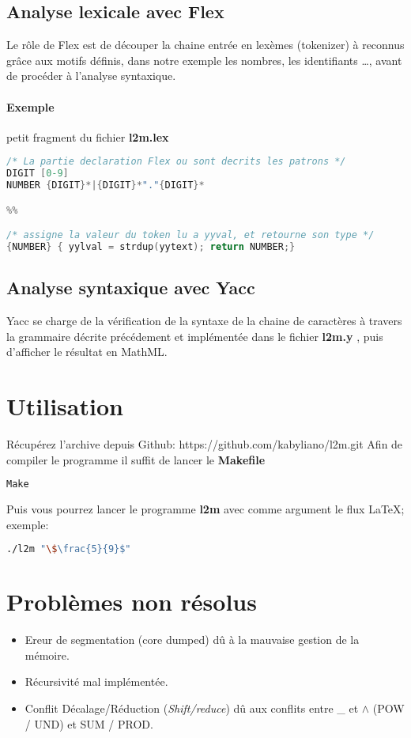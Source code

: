 \documentclass[12pt,a4paper]{article}
\begin{document}
\subsection{Analyse lexicale avec Flex}

Le rôle de Flex est de découper la chaine entrée en lexèmes (tokenizer) à reconnus grâce aux  motifs définis, dans notre exemple les nombres, les identifiants \ldots , avant de procéder à l'analyse syntaxique.

\paragraph{Exemple}
petit fragment du fichier \textbf{l2m.lex}

\begin{lstlisting}[language=C]
/* La partie declaration Flex ou sont decrits les patrons */
DIGIT [0-9]
NUMBER {DIGIT}*|{DIGIT}*"."{DIGIT}*

%%

/* assigne la valeur du token lu a yyval, et retourne son type */
{NUMBER} { yylval = strdup(yytext); return NUMBER;}

\end{lstlisting}


\subsection{Analyse syntaxique avec Yacc}
Yacc se charge de la vérification de la syntaxe de la chaine de caractères à travers la grammaire décrite précédement et implémentée dans le fichier \textbf{l2m.y} , puis d'afficher le résultat en MathML.


\section{Utilisation}

Récupérez l'archive depuis Github: https://github.com/kabyliano/l2m.git
Afin de compiler le programme il suffit de lancer le \textbf{Makefile}

\begin{lstlisting}[language=Bash]
Make
\end{lstlisting}
Puis vous pourrez lancer le programme \textbf{l2m} avec comme argument le flux \LaTeX; exemple:

\begin{lstlisting}[language=Bash]
./l2m "\$\frac{5}{9}$"
\end{lstlisting}

\section{Problèmes non résolus}
\begin{itemize}
	\item Ereur de segmentation (core dumped) dû à la mauvaise gestion de la mémoire.
	\item Récursivité mal implémentée.
	\item Conflit Décalage/Réduction (\textit{Shift/reduce}) dû aux conflits entre \_ et $\wedge$ (POW / UND) et SUM / PROD.
\end{itemize}

	
\end{document}
